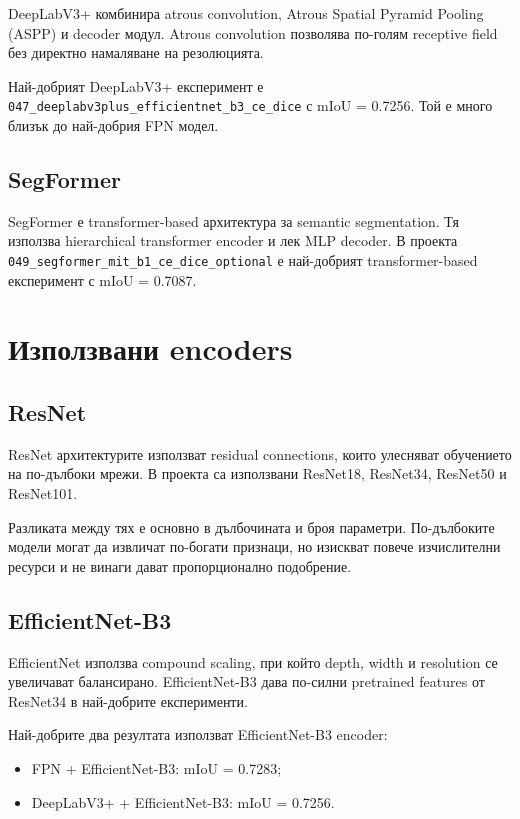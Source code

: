 \documentclass[12pt,a4paper]{article}
\newcommand{\code}[1]{\texttt{#1}}
\begin{document}
DeepLabV3+ комбинира atrous convolution, Atrous Spatial Pyramid Pooling (ASPP) и decoder модул. Atrous convolution позволява по-голям receptive field без директно намаляване на резолюцията.

Най-добрият DeepLabV3+ експеримент е \code{047\_deeplabv3plus\_efficientnet\_b3\_ce\_dice} с mIoU = 0.7256. Той е много близък до най-добрия FPN модел.

\subsection{SegFormer}

SegFormer е transformer-based архитектура за semantic segmentation. Тя използва hierarchical transformer encoder и лек MLP decoder. В проекта \code{049\_segformer\_mit\_b1\_ce\_dice\_optional} е най-добрият transformer-based експеримент с mIoU = 0.7087.

\section{Използвани encoders}

\subsection{ResNet}

ResNet архитектурите използват residual connections, които улесняват обучението на по-дълбоки мрежи. В проекта са използвани ResNet18, ResNet34, ResNet50 и ResNet101.

Разликата между тях е основно в дълбочината и броя параметри. По-дълбоките модели могат да извличат по-богати признаци, но изискват повече изчислителни ресурси и не винаги дават пропорционално подобрение.

\subsection{EfficientNet-B3}

EfficientNet използва compound scaling, при който depth, width и resolution се увеличават балансирано. EfficientNet-B3 дава по-силни pretrained features от ResNet34 в най-добрите експерименти.

Най-добрите два резултата използват EfficientNet-B3 encoder:

\begin{itemize}
  \item FPN + EfficientNet-B3: mIoU = 0.7283;
  \item DeepLabV3+ + EfficientNet-B3: mIoU = 0.7256.
\end{itemize}
\end{document}
